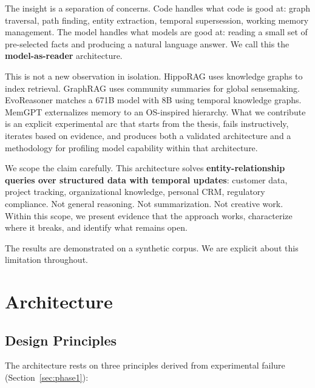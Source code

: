 \documentclass[11pt,a4paper]{article}
\begin{document}
The insight is a separation of concerns. Code handles what code is good at: graph traversal, path finding, entity extraction, temporal supersession, working memory management. The model handles what models are good at: reading a small set of pre-selected facts and producing a natural language answer. We call this the \textbf{model-as-reader} architecture.

This is not a new observation in isolation. HippoRAG \citep{gutierrez2024hipporag} uses knowledge graphs to index retrieval. GraphRAG \citep{edge2024graphrag} uses community summaries for global sensemaking. EvoReasoner \citep{evoreasoner2024} matches a 671B model with 8B using temporal knowledge graphs. MemGPT \citep{packer2023memgpt} externalizes memory to an OS-inspired hierarchy. What we contribute is an explicit experimental arc that starts from the thesis, fails instructively, iterates based on evidence, and produces both a validated architecture and a methodology for profiling model capability within that architecture.

We scope the claim carefully. This architecture solves \textbf{entity-relationship queries over structured data with temporal updates}: customer data, project tracking, organizational knowledge, personal CRM, regulatory compliance. Not general reasoning. Not summarization. Not creative work. Within this scope, we present evidence that the approach works, characterize where it breaks, and identify what remains open.

The results are demonstrated on a synthetic corpus. We are explicit about this limitation throughout.

\section{Architecture}
\label{sec:arch}

\subsection{Design Principles}

The architecture rests on three principles derived from experimental failure (Section~\ref{sec:phase1}):
\end{document}
